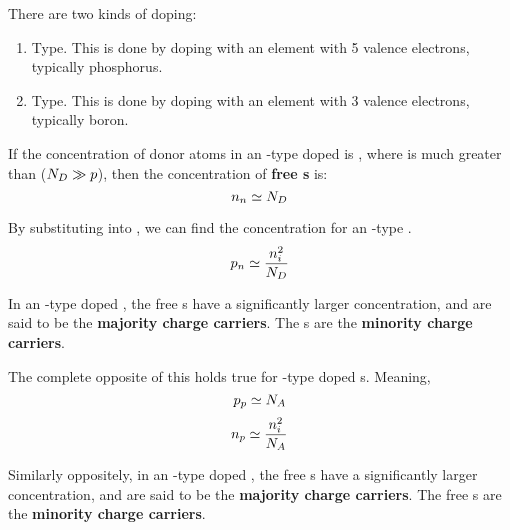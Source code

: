 There are two kinds of doping:
\begin{enumerate}[noitemsep]
\item \ElectronConcentration{} Type.
  This is done by doping with an element with 5 valence electrons, typically phosphorus.
\item \HoleConcentration{} Type.
  This is done by doping with an element with 3 valence electrons, typically boron.
\end{enumerate}

If the concentration of donor atoms in an \ElectronConcentration{}-type doped  is \DonorConcentration{}, where \DonorConcentration{} is much greater than \HoleElectronConcentration{} ($N_{D} \gg p$), then the concentration of \textbf{free s} is:
\begin{equation}\label{eq:n-Type_Donor_Concentration}
  n_{n} \simeq N_{D}
\end{equation}

By substituting  into , we can find the  concentration for an \ElectronConcentration{}-type .
\begin{equation}\label{eq:n-Type_Acceptor_Concentration}
  p_{n} \simeq \frac{n_{i}^{2}}{N_{D}}
\end{equation}

In an \NType-type doped , the free s have a significantly larger concentration, and are said to be the \textbf{majority charge carriers}.
The s are the \textbf{minority charge carriers}.

\begin{blackbox}
  The complete opposite of this holds true for \PType{}-type doped s.
  Meaning,
  \begin{equation*}
    p_{p} \simeq N_{A}
  \end{equation*}
  \begin{equation*}
    n_{p} \simeq \frac{n_{i}^{2}}{N_{A}}
  \end{equation*}

  Similarly oppositely, in an \PType-type doped , the free s have a significantly larger concentration, and are said to be the \textbf{majority charge carriers}.
The free s are the \textbf{minority charge carriers}.
\end{blackbox}

